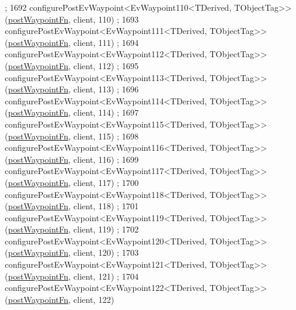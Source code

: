 \begin{DoxyCode}
      ;
1692     configurePostEvWaypoint<EvWaypoint110<TDerived, TObjectTag>>(\hyperlink{classcl__move__base__z_1_1WaypointEventDispatcher_a964a57fcce5d48ec60243230722d8dd7}{postWaypointFn}, client, 110)
      ;
1693     configurePostEvWaypoint<EvWaypoint111<TDerived, TObjectTag>>(\hyperlink{classcl__move__base__z_1_1WaypointEventDispatcher_a964a57fcce5d48ec60243230722d8dd7}{postWaypointFn}, client, 111)
      ;
1694     configurePostEvWaypoint<EvWaypoint112<TDerived, TObjectTag>>(\hyperlink{classcl__move__base__z_1_1WaypointEventDispatcher_a964a57fcce5d48ec60243230722d8dd7}{postWaypointFn}, client, 112)
      ;
1695     configurePostEvWaypoint<EvWaypoint113<TDerived, TObjectTag>>(\hyperlink{classcl__move__base__z_1_1WaypointEventDispatcher_a964a57fcce5d48ec60243230722d8dd7}{postWaypointFn}, client, 113)
      ;
1696     configurePostEvWaypoint<EvWaypoint114<TDerived, TObjectTag>>(\hyperlink{classcl__move__base__z_1_1WaypointEventDispatcher_a964a57fcce5d48ec60243230722d8dd7}{postWaypointFn}, client, 114)
      ;
1697     configurePostEvWaypoint<EvWaypoint115<TDerived, TObjectTag>>(\hyperlink{classcl__move__base__z_1_1WaypointEventDispatcher_a964a57fcce5d48ec60243230722d8dd7}{postWaypointFn}, client, 115)
      ;
1698     configurePostEvWaypoint<EvWaypoint116<TDerived, TObjectTag>>(\hyperlink{classcl__move__base__z_1_1WaypointEventDispatcher_a964a57fcce5d48ec60243230722d8dd7}{postWaypointFn}, client, 116)
      ;
1699     configurePostEvWaypoint<EvWaypoint117<TDerived, TObjectTag>>(\hyperlink{classcl__move__base__z_1_1WaypointEventDispatcher_a964a57fcce5d48ec60243230722d8dd7}{postWaypointFn}, client, 117)
      ;
1700     configurePostEvWaypoint<EvWaypoint118<TDerived, TObjectTag>>(\hyperlink{classcl__move__base__z_1_1WaypointEventDispatcher_a964a57fcce5d48ec60243230722d8dd7}{postWaypointFn}, client, 118)
      ;
1701     configurePostEvWaypoint<EvWaypoint119<TDerived, TObjectTag>>(\hyperlink{classcl__move__base__z_1_1WaypointEventDispatcher_a964a57fcce5d48ec60243230722d8dd7}{postWaypointFn}, client, 119)
      ;
1702     configurePostEvWaypoint<EvWaypoint120<TDerived, TObjectTag>>(\hyperlink{classcl__move__base__z_1_1WaypointEventDispatcher_a964a57fcce5d48ec60243230722d8dd7}{postWaypointFn}, client, 120)
      ;
1703     configurePostEvWaypoint<EvWaypoint121<TDerived, TObjectTag>>(\hyperlink{classcl__move__base__z_1_1WaypointEventDispatcher_a964a57fcce5d48ec60243230722d8dd7}{postWaypointFn}, client, 121)
      ;
1704     configurePostEvWaypoint<EvWaypoint122<TDerived, TObjectTag>>(\hyperlink{classcl__move__base__z_1_1WaypointEventDispatcher_a964a57fcce5d48ec60243230722d8dd7}{postWaypointFn}, client, 122)

\end{DoxyCode}
